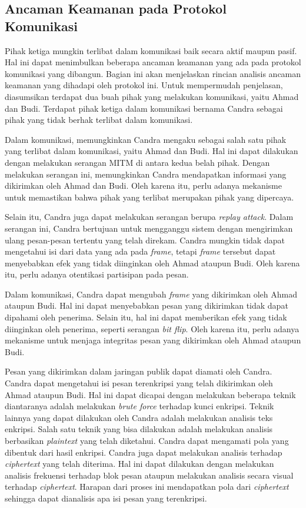 \subsection{Ancaman Keamanan pada Protokol Komunikasi}
\label{sec:ancaman-keamanan}

Pihak ketiga mungkin terlibat dalam komunikasi baik secara aktif maupun pasif. Hal ini dapat menimbulkan beberapa ancaman keamanan yang ada pada protokol komunikasi yang dibangun. Bagian ini akan menjelaskan rincian analisis ancaman keamanan yang dihadapi oleh protokol ini. Untuk mempermudah penjelasan, diasumsikan terdapat dua buah pihak yang melakukan komunikasi, yaitu Ahmad dan Budi. Terdapat pihak ketiga dalam komunikasi bernama Candra sebagai pihak yang tidak berhak terlibat dalam komunikasi. 

Dalam komunikasi, memungkinkan Candra mengaku sebagai salah satu pihak yang terlibat dalam komunikasi, yaitu Ahmad dan Budi. Hal ini dapat dilakukan dengan melakukan serangan MITM di antara kedua belah pihak. Dengan melakukan serangan ini, memungkinkan Candra mendapatkan informasi yang dikirimkan oleh Ahmad dan Budi. Oleh karena itu, perlu adanya mekanisme untuk memastikan bahwa pihak yang terlibat merupakan pihak yang dipercaya.

Selain itu, Candra juga dapat melakukan serangan berupa \emph{replay attack}. Dalam serangan ini, Candra bertujuan untuk mengganggu sistem dengan mengirimkan ulang pesan-pesan tertentu yang telah direkam. Candra mungkin tidak dapat mengetahui isi dari data yang ada pada \emph{frame}, tetapi \emph{frame} tersebut dapat menyebabkan efek yang tidak diinginkan oleh Ahmad ataupun Budi. Oleh karena itu, perlu adanya otentikasi partisipan pada pesan.

Dalam komunikasi, Candra dapat mengubah \emph{frame} yang dikirimkan oleh Ahmad ataupun Budi. Hal ini dapat menyebabkan pesan yang dikirimkan tidak dapat dipahami oleh penerima. Selain itu, hal ini dapat memberikan efek yang tidak diinginkan oleh penerima, seperti serangan \emph{bit flip}. Oleh karena itu, perlu adanya mekanisme untuk menjaga integritas pesan yang dikirimkan oleh Ahmad ataupun Budi.

Pesan yang dikirimkan dalam jaringan publik dapat diamati oleh Candra. Candra dapat mengetahui isi pesan terenkripsi yang telah dikirimkan oleh Ahmad ataupun Budi. Hal ini dapat dicapai dengan melakukan beberapa teknik diantaranya adalah melakukan \emph{brute force} terhadap kunci enkripsi. Teknik lainnya yang dapat dilakukan oleh Candra adalah melakukan analisis teks enkripsi. Salah satu teknik yang bisa dilakukan adalah melakukan analisis berbasikan \emph{plaintext} yang telah diketahui. Candra dapat mengamati pola yang dibentuk dari hasil enkripsi. Candra juga dapat melakukan analisis terhadap \emph{ciphertext} yang telah diterima. Hal ini dapat dilakukan dengan melakukan analisis frekuensi terhadap blok pesan ataupun melakukan analisis secara visual terhadap \emph{ciphertext}. Harapan dari proses ini mendapatkan pola dari \emph{ciphertext} sehingga dapat dianalisis apa isi pesan yang terenkripsi.

